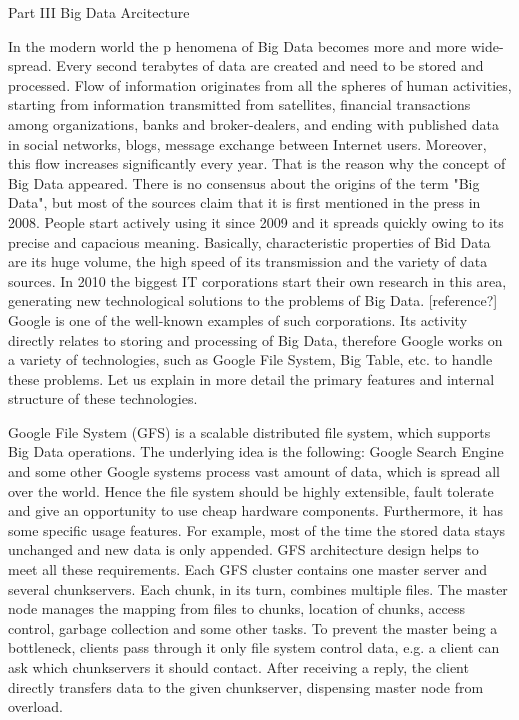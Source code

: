 Part III Big Data Arcitecture

In the modern world the p  henomena of Big Data becomes more and more wide-spread. Every second terabytes of data are created and need to be stored and processed. Flow of information originates from all the spheres of human activities, starting from information transmitted from satellites, financial transactions among organizations, banks and broker-dealers, and ending with published data in social networks, blogs, message exchange between Internet users. Moreover, this flow increases significantly every year. That is the reason why the concept of Big Data appeared. There is no consensus about the origins of the term "Big Data", but most of the sources claim that it is first mentioned in the press in 2008. People start actively using it since 2009 and it spreads quickly owing to its precise and capacious meaning. Basically, characteristic properties of Bid Data are its huge volume, the high speed of its transmission and the variety of data sources. In 2010 the biggest IT corporations start their own research in this area, generating new technological solutions to the problems of Big Data.  [reference?] Google is one of the well-known examples of such corporations. Its activity directly relates to storing and processing of Big Data, therefore Google works on a variety of technologies, such as Google File System, Big Table, etc. to handle these problems. Let us explain in more detail the primary features and internal structure of these technologies.

Google File System (GFS) is a scalable distributed file system, which supports Big Data operations. The underlying idea is the following: Google Search Engine and some other Google systems process vast amount of data, which is spread all over the world. Hence the file system should be highly extensible, fault tolerate and give an opportunity to use cheap hardware components. Furthermore, it has some specific usage features. For example, most of the time the stored data stays unchanged and new data is only appended. GFS architecture design helps to meet all these requirements. Each GFS cluster contains one master server and several chunkservers. Each chunk, in its turn, combines multiple files. The master node manages the mapping from files to chunks, location of chunks, access control, garbage collection and some other tasks. To prevent the master being a bottleneck, clients pass through it only file system control data, e.g. a client can ask which chunkservers it should contact. After receiving a reply, the client directly transfers data to the given chunkserver, dispensing master node from overload. 

